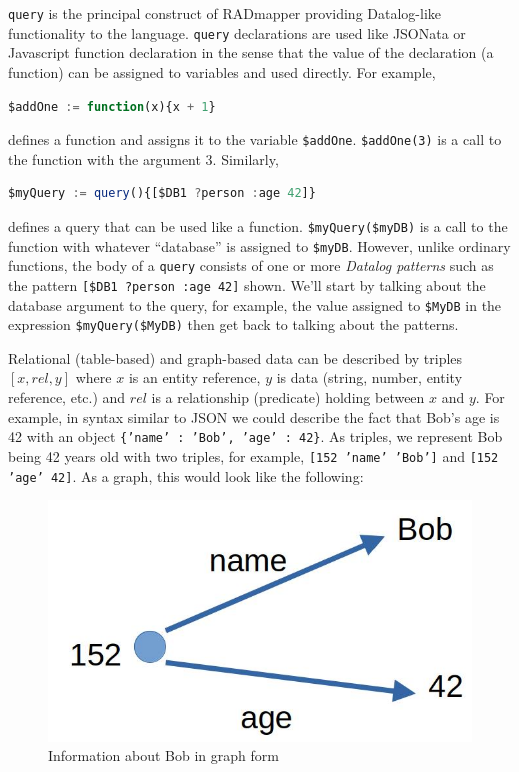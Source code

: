 \documentclass[9pt,letterpaper]{article}
\newcommand{\stt}[1]{\texttt{#1}} %
\begin{document}
\stt{query} is the principal construct of RADmapper providing Datalog-like functionality to the language.
\stt{query} declarations are used like JSONata or Javascript function declaration in the sense that the value of the declaration (a function) can be assigned to variables and used directly.
For example,
\begin{lstlisting}[language=JavaScript,numbers=none,basicstyle=\ttfamily\scriptsize]
$addOne := function(x){x + 1}
\end{lstlisting} \vspace{-2em}
defines a function and assigns it to the variable \stt{\$addOne}.
\stt{\$addOne(3)} is a call to the function with the argument 3.
Similarly,
\begin{lstlisting}[language=JavaScript,numbers=none,basicstyle=\ttfamily\scriptsize]
$myQuery := query(){[$DB1 ?person :age 42]}
\end{lstlisting} \vspace{-2em}
defines a query that can be used like a function.
\stt{\$myQuery(\$myDB)} is a call to the function with whatever ``database'' is assigned to \stt{\$myDB}.
However, unlike ordinary functions, the body of a \stt{query} consists of one or more \textit{Datalog patterns} such as the pattern \stt{[\$DB1 ?person :age 42]} shown.
We'll start by talking about the database argument to the query, for example, the value assigned to \stt{\$MyDB} in the expression \stt{\$myQuery(\$MyDB)} then get back to talking about the patterns.

Relational (table-based) and graph-based data can be described by triples $[x,rel,y]$ where $x$ is an entity reference, $y$ is data (string, number, entity reference, etc.) and $rel$ is a relationship (predicate) holding between $x$ and $y$.
For example, in syntax similar to JSON we could describe the fact that Bob's age is 42 with an object \stt{\{'name' : 'Bob', 'age' : 42\}}.
As triples, we represent Bob being 42 years old with two triples, for example, \stt{[152 'name' 'Bob']} and \stt{[152 'age' 42]}.
As a graph, this would look like the following:

\begin{figure}[H]
  \caption{Information about Bob in graph form}
  \label{fig:bob-as-a-graph}
     \includegraphics[scale=0.15]{bob-age-42.jpg}
  \centering
\end{figure}
\end{document}
